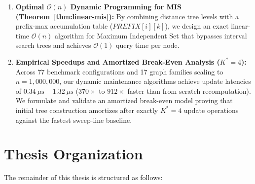 \begin{enumerate}[label=\textbf{\arabic*.}]
    \item \textbf{Optimal $\mathcal{O}(n)$ Dynamic Programming for MIS (Theorem~\ref{thm:linear-mis}):} By combining distance tree levels with a prefix-max accumulation table ($PREFIX[i][k]$), we design an exact linear-time $\mathcal{O}(n)$ algorithm for Maximum Independent Set that bypasses interval search trees and achieves $\mathcal{O}(1)$ query time per node.
    
    \item \textbf{Empirical Speedups and Amortized Break-Even Analysis ($K^* = 4$):} Across 77 benchmark configurations and 17 graph families scaling to $n=1,000,000$, our dynamic maintenance algorithms achieve update latencies of $0.34\ \mu\text{s} - 1.32\ \mu\text{s}$ ($370\times$ to $912\times$ faster than from-scratch recomputation). We formulate and validate an amortized break-even model proving that initial tree construction amortizes after exactly $K^* = 4$ update operations against the fastest sweep-line baseline.
\end{enumerate}

\section{Thesis Organization}
\label{sec:intro_organization}

The remainder of this thesis is structured as follows:

